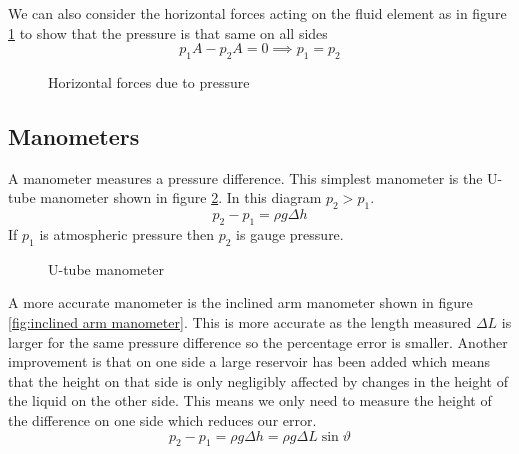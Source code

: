 \documentclass{article}
\begin{document}
    We can also consider the horizontal forces acting on the fluid element as in figure \ref{fig:horizontal pressure} to show that the pressure is that same on all sides
    \[p_1A-p_2A = 0\implies p_1 = p_2\]
    \begin{figure}[ht]
        \centering
        \caption{Horizontal forces due to pressure}
        \label{fig:horizontal pressure}
    \end{figure}
    \subsection{Manometers}
    A manometer measures a pressure difference. 
    This simplest manometer is the U-tube manometer shown in figure \ref{fig:u-tube manometer}.
    In this diagram \(p_2 > p_1\).
    \[p_2-p_1 = \rho g\Delta h\]
    If \(p_1\) is atmospheric pressure then \(p_2\) is gauge pressure.
    \begin{figure}[ht]
        \centering
        \caption{U-tube manometer}
        \label{fig:u-tube manometer}
    \end{figure}
    A more accurate manometer is the inclined arm manometer shown in figure \ref{fig:inclined arm manometer}. 
    This is more accurate as the length measured \(\Delta L\) is larger for the same pressure difference so the percentage error is smaller.
    Another improvement is that on one side a large reservoir has been added which means that the height on that side is only negligibly affected by changes in the height of the liquid on the other side.
    This means we only need to measure the height of the difference on one side which reduces our error.
    \[p_2 - p_1 = \rho g\Delta h = \rho g\Delta L\sin\vartheta\]
    
\end{document}
